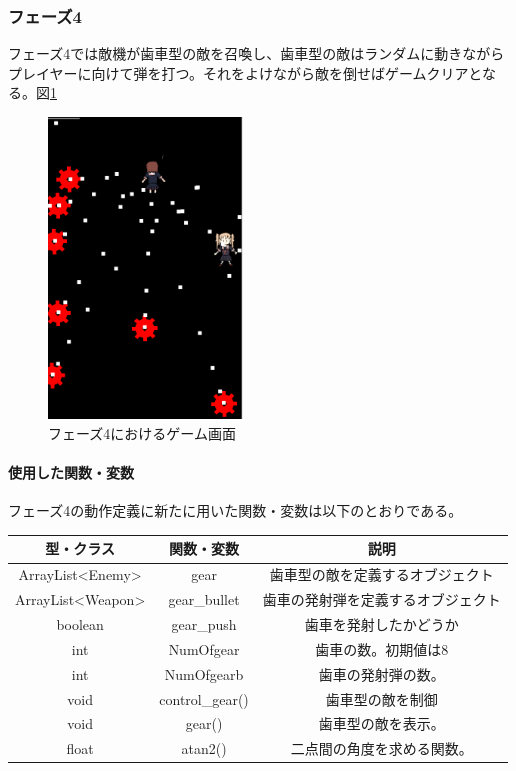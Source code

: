 \documentclass[a4paper,titlepage,11pt]{ltjsarticle}
\begin{document}
\subsubsection{フェーズ4}
フェーズ4では敵機が歯車型の敵を召喚し、歯車型の敵はランダムに動きながら
プレイヤーに向けて弾を打つ。それをよけながら敵を倒せばゲームクリアとなる。図\ref{phase4}
\begin{figure}[H]
\begin{center}
\includegraphics*[height = 8cm]{drawing_21.png}
\caption{フェーズ4におけるゲーム画面}
\label{phase4}
\end{center}
\end{figure}
\paragraph{使用した関数・変数}
フェーズ4の動作定義に新たに用いた関数・変数は以下のとおりである。
\begin{table}[H]
	\begin{tabular}{|c|c|c|}
		\hline
		型・クラス & 関数・変数 & 説明 \\ \hline \hline
		ArrayList<Enemy> & gear & 歯車型の敵を定義するオブジェクト \\ \hline
		ArrayList<Weapon> & gear\_bullet & 歯車の発射弾を定義するオブジェクト \\ \hline
		boolean & gear\_push & 歯車を発射したかどうか  \\ \hline
		int & NumOfgear & 歯車の数。初期値は8 \\ \hline
		int & NumOfgearb & 歯車の発射弾の数。 \\ \hline
		void & control\_gear() & 歯車型の敵を制御  \\ \hline
		void & gear() & 歯車型の敵を表示。 \\ \hline
		float & atan2() & 二点間の角度を求める関数。 \\ \hline
	\end{tabular}
\end{table}
\end{document}
